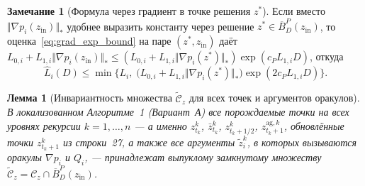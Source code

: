 \documentclass[11pt, a4paper]{article}
\newtheorem{lemma}{Лемма}[section]
\theoremstyle{definition}
\newtheorem{remark}{Замечание}[section]
\begin{document}
\begin{remark}[Формула через градиент в точке решения $z^*$]
Если вместо $\Vert \nabla p_i(z_{\mathrm{in}}) \Vert_*$ удобнее выразить константу через решение $z^* \in \overline{B}_D^P(z_{\mathrm{in}})$, то оценка~\eqref{eq:grad_exp_bound} на паре $(z^*, z_{\mathrm{in}})$ даёт $L_{0,i} + L_{1,i}\Vert \nabla p_i(z_{\mathrm{in}}) \Vert_* \le (L_{0,i} + L_{1,i}\Vert \nabla p_i(z^*) \Vert_*) \exp(c_P L_{1,i} D)$, откуда
\[
\widehat{L}_i(D) \le \min\Big\{L_i,\; \big(L_{0,i} + L_{1,i} \Vert \nabla p_i(z^*) \Vert_*\big) \exp(2 c_P L_{1,i} D)\Big\}.
\]
\end{remark}

\begin{lemma}[Инвариантность множества $\widetilde{\mathcal{C}}_z$ для всех точек и аргументов оракулов]\label{lem:invariance_Cz}
В локализованном Алгоритме~1 (Вариант~А) все порождаемые точки на всех уровнях рекурсии $k = 1, \dots, n$ --- а именно $z_{t_k}^k$, $\bar{z}_{t_k}^k$, $z_{t_k + 1/2}^k$, $z_{t_k + 1}^{\mathrm{ag}, k}$, обновлённые точки $z_{t_k + 1}^k$ из строки~27, а также все аргументы $\tilde{z}_i^k$, в которых вызываются оракулы $\nabla p_i$ и $Q_i$, --- принадлежат выпуклому замкнутому множеству $\widetilde{\mathcal{C}}_z = \mathcal{C}_z \cap \overline{B}_D^P(z_{\mathrm{in}})$.
\end{lemma}
\end{document}
